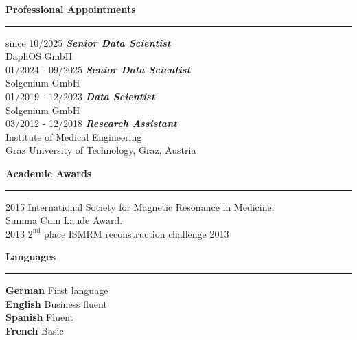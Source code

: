 \vspace{0.7cm}
{\bf Professional Appointments}\\
\noindent\rule{\textwidth}{0.5pt}
\begin{tabbing} 
since 10/2025 \quad \quad \quad \= \emph{\textbf{Senior Data Scientist}}\\
 \> DaphOS GmbH \\

01/2024 - 09/2025 \quad  \= \emph{\textbf{Senior Data Scientist}}\\
 \> Solgenium GmbH \\

01/2019 - 12/2023 \quad  \= \emph{\textbf{Data Scientist}}\\
 \> Solgenium GmbH \\

03/2012 - 12/2018 \quad  \= \emph{\textbf{Research Assistant}}\\
  \> Institute of Medical Engineering\\
  \> Graz University of Technology, Graz, Austria \\
\end{tabbing}
\bigskip

{\bf Academic Awards}\\
\noindent\rule{\textwidth}{0.5pt}
\begin{tabbing} 
2015 \quad \= International Society for Magnetic Resonance in Medicine: \\
     \> Summa Cum Laude Award. \\
2013 \> $2^{\mathrm{nd}}$ place ISMRM reconstruction challenge 2013 \\
\end{tabbing}


\vspace{0.7cm}
{\bf Languages}\\
\noindent\rule{\textwidth}{0.5pt}
\begin{tabbing} 
	\textbf{German} \quad \= First language \\
	\textbf{English} \>  Business fluent \\
	\textbf{Spanish} \>  Fluent \\
	\textbf{French} \> Basic
\end{tabbing}
\bigskip

